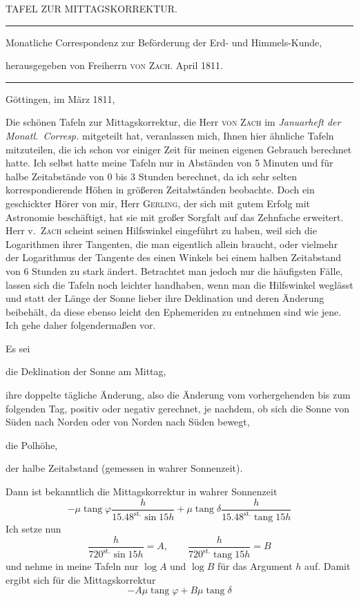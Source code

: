 \clearpage{}%
\begin{center}
{\small TAFEL ZUR MITTAGSKORREKTUR.\par}
\medskip\hrule\medskip
{\small Monatliche Correspondenz zur Beförderung der Erd- und Himmels-Kunde,\par
herausgegeben von Freiherrn \textsc{von Zach}. April 1811.\par}
\medskip\hrule
\end{center}\medskip
\begin{flushright}Göttingen, im März 1811,\end{flushright}
Die schönen Tafeln zur Mittagskorrektur, die Herr \textsc{von Zach} im \emph{Januarheft der Monatl.\ Corresp.} mitgeteilt hat, veranlassen mich, Ihnen hier ähnliche Tafeln mitzuteilen, die ich schon vor einiger Zeit für meinen eigenen Gebrauch berechnet hatte. Ich selbst hatte meine Tafeln nur in Abständen von 5 Minuten und für halbe Zeitabstände von 0 bis 3 Stunden berechnet, da ich sehr selten korrespondierende Höhen in größeren Zeitabständen beobachte. Doch ein geschickter Hörer von mir, Herr \textsc{Gerling}, der sich mit gutem Erfolg mit Astronomie beschäftigt, hat sie mit großer Sorgfalt auf das Zehnfache erweitert. Herr v.\ \textsc{Zach} scheint seinen Hilfswinkel eingeführt zu haben, weil sich die Logarithmen ihrer Tangenten, die man eigentlich allein braucht, oder vielmehr der Logarithmus der Tangente des einen Winkels bei einem halben Zeitabstand von 6 Stunden zu stark ändert. Betrachtet man jedoch nur die häufigsten Fälle, lassen sich die Tafeln noch leichter handhaben, wenn man die Hilfswinkel weglässt und statt der Länge der Sonne lieber ihre Deklination und deren Änderung beibehält, da diese ebenso leicht den Ephemeriden zu entnehmen sind wie jene. Ich gehe daher folgendermaßen vor.
%

Es sei
\begin{list}{}{\setlength{\leftmargin}{1.8em}\setlength{\labelwidth}{1.2em}\setlength{\labelsep}{.6em}\setlength{\itemsep}{0pt}\setlength{\parsep}{0pt}}
\item[$\delta$] die Deklination der Sonne am Mittag,
\item[$\mu$] ihre doppelte tägliche Änderung, also die Änderung vom vorhergehenden bis zum folgenden Tag, positiv oder negativ gerechnet, je nachdem, ob sich die Sonne von Süden nach Norden oder von Norden nach Süden bewegt,
\item[$\varphi$] die Polhöhe,
\item[$h$] der halbe Zeitabstand (gemessen in wahrer Sonnenzeit).
\end{list}
Dann ist bekanntlich die Mittagskorrektur in wahrer Sonnenzeit
\[
-\mu\operatorname{tang}\varphi\frac h{15.48^{\mathrm{st.}}\sin15h}+\mu\operatorname{tang}\delta\frac h{15.48^{\mathrm{st.}}\operatorname{tang}15h}
\]
Ich setze nun
\[
\frac h{720^{\mathrm{st.}}\sin15h}=A,\qquad\frac h{720^{\mathrm{st.}}\operatorname{tang}15h}=B
\]
und nehme in meine Tafeln nur $\log A$ und $\log B$ für das Argument $h$ auf. Damit ergibt sich für die Mittagskorrektur
\[
-A\mu\operatorname{tang}\varphi+B\mu\operatorname{tang}\delta
\]

